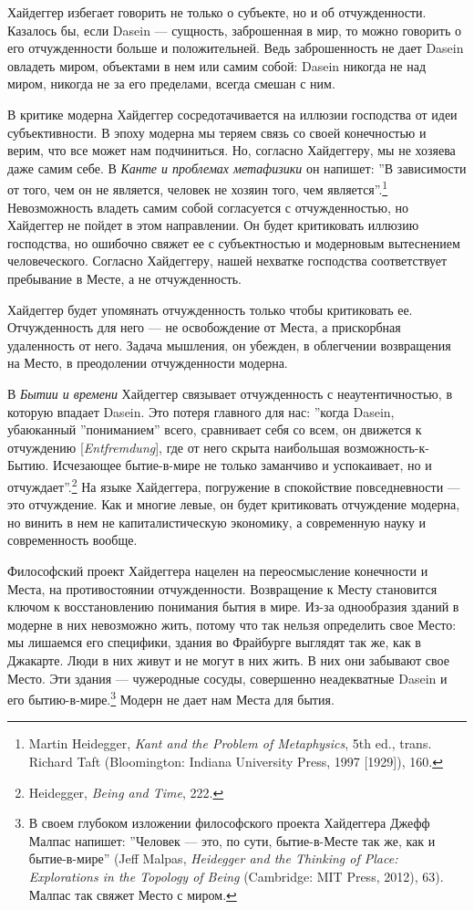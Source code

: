 \documentclass[12pt]{book}
\begin{document}
Хайдеггер избегает говорить не только о субъекте, но и об отчужденности. Казалось бы, если Dasein --- сущность, заброшенная в мир, то можно говорить о его отчужденности больше и положительней. Ведь заброшенность не дает Dasein овладеть миром, объектами в нем или самим собой: Dasein никогда не над миром, никогда не за его пределами, всегда смешан с ним.

В критике модерна Хайдеггер сосредотачивается на иллюзии господства от идеи субъективности. В эпоху модерна мы теряем связь со своей конечностью и верим, что все может нам подчиниться. Но, согласно Хайдеггеру, мы не хозяева даже самим себе. В \textit{Канте и проблемах метафизики} он напишет: ''В зависимости от того, чем он не является, человек не хозяин того, чем является''.\footnote{Martin Heidegger, \textit{Kant and the Problem of Metaphysics}, 5th ed., trans. Richard Taft (Bloomington: Indiana University Press, 1997 [1929]), 160.} Невозможность владеть самим собой согласуется с отчужденностью, но Хайдеггер не пойдет в этом направлении. Он будет критиковать иллюзию господства, но ошибочно свяжет ее с субъектностью и модерновым вытеснением человеческого. Согласно Хайдеггеру, нашей нехватке господства соответствует пребывание в Месте, а не отчужденность.

Хайдеггер будет упомянать отчужденность только чтобы критиковать ее. Отчужденность для него --- не освобождение от Места, а прискорбная удаленность от него. Задача мышления, он убежден, в облегчении возвращения на Место, в преодолении отчужденности модерна.

В \textit{Бытии и времени} Хайдеггер связывает отчужденность с неаутентичностью, в которую впадает Dasein. Это потеря главного для нас: ''когда Dasein, убаюканный ''пониманием'' всего, сравнивает себя со всем, он движется к отчуждению [\textit{Entfremdung}], где от него скрыта наибольшая возможность-к-Бытию. Исчезающее бытие-в-мире не только заманчиво и успокаивает, но и отчуждает''.\footnote{Heidegger, \textit{Being and Time}, 222.} На языке Хайдеггера, погружение в спокойствие повседневности --- это отчуждение. Как и многие левые, он будет критиковать отчуждение модерна, но винить в нем не капиталистическую экономику, а современную науку и современность вообще.

Философский проект Хайдеггера нацелен на переосмысление конечности и Места, на противостоянии отчужденности. Возвращение к Месту становится ключом к восстановлению понимания бытия в мире. Из-за однообразия зданий в модерне в них невозможно жить, потому что так нельзя определить свое Место: мы лишаемся его специфики, здания во Фрайбурге выглядят так же, как в Джакарте. Люди в них живут и не могут в них жить. В них они забывают свое Место. Эти здания --- чужеродные сосуды, совершенно неадекватные Dasein и его бытию-в-мире.\footnote{В своем глубоком изложении философского проекта Хайдеггера Джефф Малпас напишет: ''Человек --- это, по сути, бытие-в-Месте так же, как и бытие-в-мире'' (Jeff Malpas, \textit{Heidegger and the Thinking of Place: Explorations in the Topology of Being} (Cambridge: MIT Press, 2012), 63). Малпас так свяжет Место с миром.} Модерн не дает нам Места для бытия.
\end{document}
